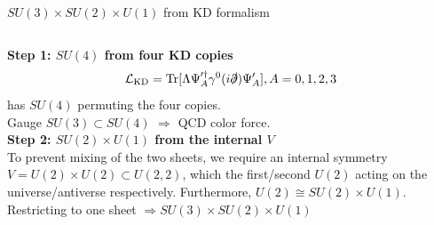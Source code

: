 \documentclass[aspectratio=169]{beamer}
\newcommand{\Blue}[1]{{\color{cptblue}#1}}
\begin{document}
\begin{frame}[noframenumbering]{$SU(3)\times SU(2)\times U(1)$ from KD formalism}
  \begin{columns}[T]
      \textbf{Step 1: $SU(4)$ from four KD copies}\\[-1em]
      \[
        \mathcal{L}_{\rm KD}
        = \mathrm{Tr}[\Lambda\Psi_A^{\prime\dagger}\gamma^0(i\slashed\partial)\Psi_A'],A=0,1,2,3
      \]
       has \Blue{$SU(4)$} permuting the four copies.\\
      \Blue{Gauge $SU(3)\subset SU(4)$} $\Rightarrow$ QCD color force.\\[0.5em]
      
      \textbf{Step 2: $SU(2)\times U(1)$ from the internal $V$}\\[0.2em]
      To prevent mixing of the two sheets, we require an internal symmetry $V = U(2)\times U(2)\subset U(2,2)$, which 
      the first/second $U(2)$ acting on the universe/antiverse respectively. Furthermore, $U(2) \cong SU(2)\times U(1)$. 
      Restricting to one sheet $\Rightarrow \boxed{SU(3)\times SU(2)\times U(1)}$


\end{columns}
\end{frame}
\end{document}
